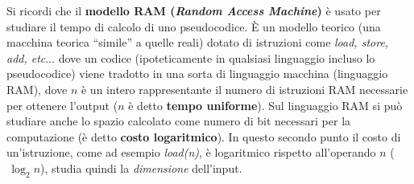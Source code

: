 Si ricordi che il \textbf{modello RAM (\textit{Random Access Machine})} è usato per studiare il tempo di calcolo di uno pseudocodice. È un modello teorico (una macchina teorica ``simile'' a quelle reali) dotato di istruzioni come \textit{load, store, add, etc$\ldots$} dove un codice (ipoteticamente in qualsiasi linguaggio incluso lo pseudocodice) viene tradotto in una sorta di linguaggio macchina (linguaggio RAM), dove $n$ è un intero rappresentante il numero di istruzioni RAM necessarie per ottenere l'output ($n$ è detto \textbf{tempo uniforme}). Sul linguaggio RAM si può studiare anche lo spazio calcolato come numero di bit necessari per la computazione (è detto \textbf{costo logaritmico}). In questo secondo punto il costo di un'istruzione, come ad esempio \textit{load(n)}, è logaritmico rispetto all'operando $n$ ($\,\log_2 n$), studia quindi la \emph{dimensione} dell'input.  
